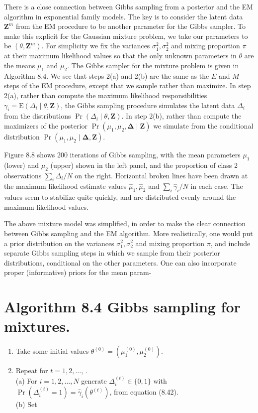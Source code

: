 \documentclass[10pt]{article}
\begin{document}
There is a close connection between Gibbs sampling from a posterior and the EM algorithm in exponential family models. The key is to consider the latent data $\mathbf{Z}^{m}$ from the EM procedure to be another parameter for the Gibbs sampler. To make this explicit for the Gaussian mixture problem, we take our parameters to be $\left(\theta, \mathbf{Z}^{m}\right)$. For simplicity we fix the variances $\sigma_{1}^{2}, \sigma_{2}^{2}$ and mixing proportion $\pi$ at their maximum likelihood values so that the only unknown parameters in $\theta$ are the means $\mu_{1}$ and $\mu_{2}$. The Gibbs sampler for the mixture problem is given in Algorithm 8.4. We see that steps 2(a) and 2(b) are the same as the $E$ and $M$ steps of the EM procedure, except that we sample rather than maximize. In step 2(a), rather than compute the maximum likelihood responsibilities $\gamma_{i}=\mathrm{E}\left(\Delta_{i} \mid \theta, \mathbf{Z}\right)$, the Gibbs sampling procedure simulates the latent data $\Delta_{i}$ from the distributions $\operatorname{Pr}\left(\Delta_{i} \mid \theta, \mathbf{Z}\right)$. In step 2(b), rather than compute the maximizers of the posterior $\operatorname{Pr}\left(\mu_{1}, \mu_{2}, \boldsymbol{\Delta} \mid \mathbf{Z}\right)$ we simulate from the conditional distribution $\operatorname{Pr}\left(\mu_{1}, \mu_{2} \mid \boldsymbol{\Delta}, \mathbf{Z}\right)$.

Figure 8.8 shows 200 iterations of Gibbs sampling, with the mean parameters $\mu_{1}$ (lower) and $\mu_{2}$ (upper) shown in the left panel, and the proportion of class 2 observations $\sum_{i} \Delta_{i} / N$ on the right. Horizontal broken lines have been drawn at the maximum likelihood estimate values $\hat{\mu}_{1}, \hat{\mu}_{2}$ and $\sum_{i} \hat{\gamma}_{i} / N$ in each case. The values seem to stabilize quite quickly, and are distributed evenly around the maximum likelihood values.

The above mixture model was simplified, in order to make the clear connection between Gibbs sampling and the EM algorithm. More realistically, one would put a prior distribution on the variances $\sigma_{1}^{2}, \sigma_{2}^{2}$ and mixing proportion $\pi$, and include separate Gibbs sampling steps in which we sample from their posterior distributions, conditional on the other parameters. One can also incorporate proper (informative) priors for the mean param-

\section*{Algorithm 8.4 Gibbs sampling for mixtures.}
\begin{enumerate}
  \item Take some initial values $\theta^{(0)}=\left(\mu_{1}^{(0)}, \mu_{2}^{(0)}\right)$.
  \item Repeat for $t=1,2, \ldots$, .\\
(a) For $i=1,2, \ldots, N$ generate $\Delta_{i}^{(t)} \in\{0,1\}$ with $\operatorname{Pr}\left(\Delta_{i}^{(t)}=1\right)= \hat{\gamma}_{i}\left(\theta^{(t)}\right)$, from equation (8.42).\\
(b) Set
\end{enumerate}
\end{document}
